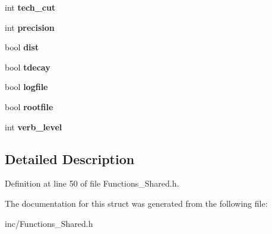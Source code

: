 \begin{DoxyCompactItemize}
\item 
\hypertarget{structopt_aced2f60b766a42008f9da934cef2f540}{int {\bfseries tech\-\_\-cut}}\label{structopt_aced2f60b766a42008f9da934cef2f540}

\item 
\hypertarget{structopt_ad36cc92ecbf8b2bc1deabde5268e9267}{int {\bfseries precision}}\label{structopt_ad36cc92ecbf8b2bc1deabde5268e9267}

\item 
\hypertarget{structopt_acd1b95ec5257a323cd3eb454c7ccd885}{bool {\bfseries dist}}\label{structopt_acd1b95ec5257a323cd3eb454c7ccd885}

\item 
\hypertarget{structopt_aedbcd7fea16a0fa968a1d75884fc0a4c}{bool {\bfseries tdecay}}\label{structopt_aedbcd7fea16a0fa968a1d75884fc0a4c}

\item 
\hypertarget{structopt_af0867351f5c3fd59d3cc5136cf423fc9}{bool {\bfseries logfile}}\label{structopt_af0867351f5c3fd59d3cc5136cf423fc9}

\item 
\hypertarget{structopt_a8d7af1ad473a324bd3633c7ef412c3fc}{bool {\bfseries rootfile}}\label{structopt_a8d7af1ad473a324bd3633c7ef412c3fc}

\item 
\hypertarget{structopt_abe0f9e730fd8eb6b107169359c859a3d}{int {\bfseries verb\-\_\-level}}\label{structopt_abe0f9e730fd8eb6b107169359c859a3d}

\end{DoxyCompactItemize}


\subsection{Detailed Description}


Definition at line 50 of file Functions\-\_\-\-Shared.\-h.



The documentation for this struct was generated from the following file\-:\begin{DoxyCompactItemize}
\item 
inc/Functions\-\_\-\-Shared.\-h\end{DoxyCompactItemize}
